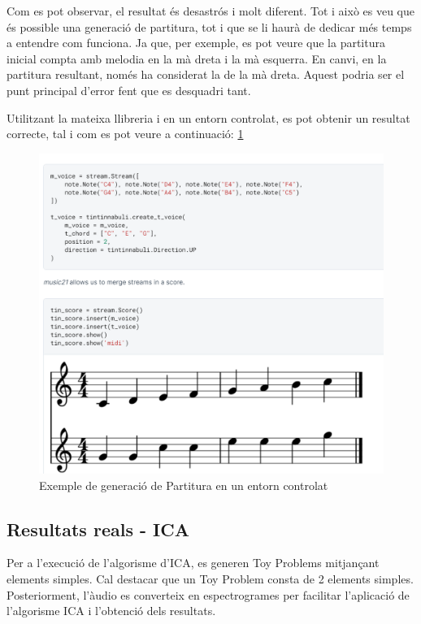 \documentclass[10pt,a4paper,twocolumn,twoside]{article}
\begin{document}
Com es pot observar, el resultat és desastrós i molt diferent. Tot i això es veu que és possible una generació de partitura, tot i que se li haurà de dedicar més temps a entendre com funciona. Ja que, per exemple, es pot veure que la partitura inicial compta amb melodia en la mà dreta i la mà esquerra. En canvi, en la partitura resultant, només ha considerat la de la mà dreta. Aquest podria ser el punt principal d'error fent que es desquadri tant.

Utilitzant la mateixa llibreria i en un entorn controlat, es pot obtenir un resultat correcte, tal i com es pot veure a continuació: \ref{fig:partiture-example}
\begin{figure}[h]
    \centering
    \includegraphics[width=1\linewidth]{img/Partiture-Example.png}
    \caption{Exemple de generació de Partitura en un entorn controlat}
    \label{fig:partiture-example}
\end{figure}


\subsection{Resultats reals - ICA}

Per a l'execució de l'algorisme d'ICA, es generen Toy Problems mitjançant elements simples. Cal destacar que un Toy Problem consta de 2 elements simples. Posteriorment, l'àudio es converteix en espectrogrames per facilitar l'aplicació de l'algorisme ICA i l'obtenció dels resultats.
\end{document}
